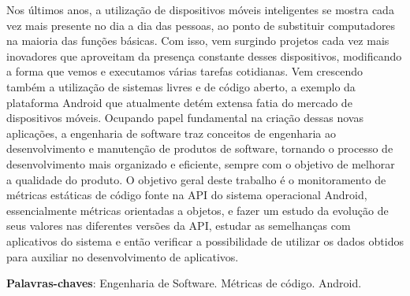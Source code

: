 \begin{resumo}

Nos últimos anos, a utilização de dispositivos móveis inteligentes se mostra cada vez mais presente no dia a dia das pessoas, ao ponto de substituir computadores na maioria das funções básicas. Com isso, vem surgindo projetos cada vez mais inovadores que aproveitam da presença constante desses dispositivos, modificando a forma que vemos e executamos várias tarefas cotidianas. Vem crescendo também a utilização de sistemas livres e de código aberto, a exemplo da plataforma Android que atualmente detém extensa fatia do mercado de dispositivos móveis. Ocupando papel fundamental na criação dessas novas aplicações, a engenharia de software traz conceitos de engenharia ao desenvolvimento e manutenção de produtos de software, tornando o processo de desenvolvimento mais organizado e eficiente, sempre com o objetivo de melhorar a qualidade do produto. O objetivo geral deste trabalho é o monitoramento de métricas estáticas de código fonte na API do sistema operacional Android, essencialmente métricas orientadas a objetos, e fazer um estudo da evolução de seus valores nas diferentes versões da API, estudar as semelhanças com aplicativos do sistema e então verificar a possibilidade de utilizar os dados obtidos para auxiliar no desenvolvimento de aplicativos.

\vspace{\onelineskip}
    
 \noindent
 \textbf{Palavras-chaves}: Engenharia de Software. Métricas de código. Android.

\end{resumo}
